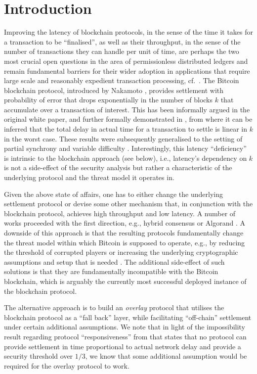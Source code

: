 
\section{Introduction}
\label{sec:intro}

Improving the latency of blockchain protocols, in the sense of the time it takes
for a transaction to be ``finalised'', as well as their throughput, in the sense
of the number of transactions they can handle per unit of time, are perhaps the
two most crucial open questions in the area of permissionless distributed
ledgers and remain fundamental barriers for their wider adoption in applications
that require large scale and reasonably expedient transaction processing,
cf.~\cite{scaling}. The Bitcoin blockchain protocol, introduced by Nakamoto
\cite{bitcoin}, provides settlement with probability of error that drops
exponentially in the number of blocks $k$ that accumulate over a transaction of
interest. This has been informally argued in the original white paper, and
further formally demonstrated in \cite{gkl}, from where it can be inferred that
the total delay in actual time for a transaction to settle is linear in $k$ in
the worst case. These results were subsequently generalised to the setting of
partial synchrony \cite{PSS16} and variable difficulty
\cite{DBLP:conf/crypto/GarayKL17}. Interestingly, this latency ``deficiency'' is
intrinsic to the blockchain approach (see below), i.e., latency's dependency on
$k$ is not a side-effect of the security analysis but rather a characteristic of
the underlying protocol and the threat model it operates in.

Given the above state of affairs, one has to either change the underlying
settlement protocol or devise some other mechanism that, in conjunction with the
blockchain protocol, achieves high throughput and low latency. A number of works
proceeded with the first direction, e.g., hybrid consensus
\cite{DBLP:conf/wdag/PassS17} or Algorand \cite{DBLP:journals/corr/Micali16}. A
downside of this approach is that the resulting protocols fundamentally change
the threat model within which Bitcoin is supposed to operate, e.g., by reducing
the threshold of corrupted players or increasing the underlying cryptographic
assumptions and setup that is needed . The additional side-effect
of such solutions is that they are fundamentally incompatible with the Bitcoin
blockchain, which is arguably the currently most successful deployed instance of
the blockchain protocol.

The alternative approach is to build an {\em overlay} protocol that utilises the
blockchain protocol as a ``fall back'' layer, while facilitating ``off-chain''
settlement under certain additional assumptions. We note that in light of the
impossibility result regarding protocol ``responsiveness'' from
\cite{DBLP:conf/wdag/PassS17} that states that no protocol can provide
settlement in time proportional to actual network delay and provide a security
threshold over $1/3$, we know that some additional assumption would be required
for the overlay protocol to work.

